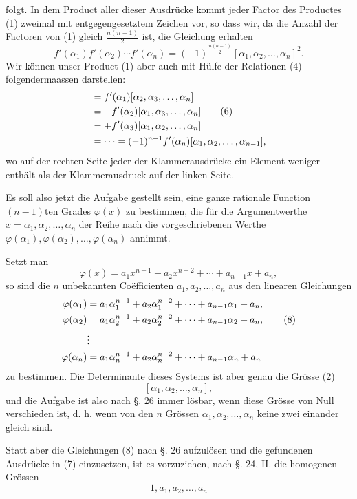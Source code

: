 
folgt. In dem Product aller dieser Ausdrücke kommt jeder Factor des Productes (1) zweimal mit entgegengesetztem Zeichen vor, so dass wir, da die Anzahl der Factoren von (1) gleich $\frac{n(n-1)}{2}$ ist, die Gleichung erhalten
\begin{equation}
 f'(\alpha_1)f'(\alpha_2)\cdots f'(\alpha_n)=(-1)^{\frac{n(n-1)}2}[\alpha_1,\alpha_2,\ldots,\alpha_n]^2.\tag{5}
\end{equation}
Wir können unser Product (1) aber auch mit Hülfe der Relationen (4) folgendermaassen darstellen:
\begin{align}
 [\alpha_1,\alpha_2,\ldots,\alpha_n]
 &= f'(\alpha_1)[\alpha_2,\alpha_3,\ldots,\alpha_n]\notag\\
 &=-f'(\alpha_2)[\alpha_1,\alpha_3,\ldots,\alpha_n]\tag{6}\\
 &=+f'(\alpha_3)[\alpha_1,\alpha_2,\ldots,\alpha_n]\notag\\%
 &=\cdots=(-1)^{n-1}f'(\alpha_n)[\alpha_1,\alpha_2,\ldots,\alpha_{n-1}],\notag
\end{align}
wo auf der rechten Seite jeder der Klammerausdrücke ein Element weniger enthält als der Klammerausdruck auf der linken Seite.

Es soll also jetzt die Aufgabe gestellt sein, eine ganze rationale Function $(n-1)$ten Grades $\varphi(x)$ zu bestimmen, die für die Argumentwerthe $x=\alpha_1,\alpha_2,\ldots,\alpha_n$ der Reihe nach die vorgeschriebenen Werthe $\varphi(\alpha_1),\varphi(\alpha_2),\ldots,\varphi(\alpha_n)$ annimmt.

Setzt man
\begin{equation}
 \varphi(x)=a_1x^{n-1}+a_2x^{n-2}+\cdots+a_{n-1}x+a_n,\tag{7}
\end{equation}
so sind die $n$ unbekannten Coëfficienten $a_1,a_2,\ldots,a_n$ aus den linearen Gleichungen
\begin{align}
 \varphi(\alpha_1)&=a_1\alpha_1^{n-1}+a_2\alpha_1^{n-2}+\cdots+a_{n-1}\alpha_1+a_n,\notag\\
 \varphi(\alpha_2)&=a_1\alpha_2^{n-1}+a_2\alpha_2^{n-2}+\cdots+a_{n-1}\alpha_2+a_n,\tag{8}\\
 &\vdots\notag\\
 \varphi(\alpha_n)&=a_1\alpha_n^{n-1}+a_2\alpha_n^{n-2}+\cdots+a_{n-1}\alpha_n+a_n\notag
\end{align}
zu bestimmen. Die Determinante dieses Systems ist aber genau die Grösse (2)
\[
[\alpha_1,\alpha_2,\ldots,\alpha_n],
\]
und die Aufgabe ist also nach §. 26 immer lösbar, wenn diese Grösse von Null verschieden ist, d. h. wenn von den $n$ Grössen $\alpha_1,\alpha_2,\ldots,\alpha_n$ keine zwei einander gleich sind.

Statt aber die Gleichungen (8) nach §. 26 aufzulösen und die gefundenen Ausdrücke in (7) einzusetzen, ist es vorzuziehen, nach §. 24, II. die homogenen Grössen
\[
1,a_1,a_2,\ldots,a_n
\]
